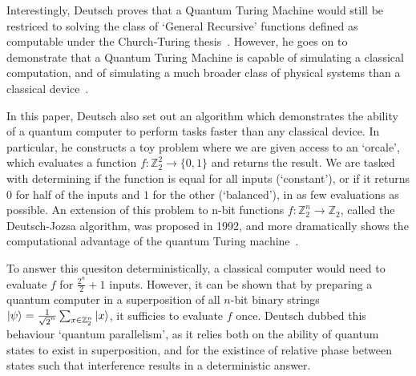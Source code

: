 \documentclass{standalone}
\begin{document}
\par
Interestingly, Deutsch proves that a Quantum Turing Machine would still be restriced to solving the class of `General Recursive' functions defined as computable under the Church-Turing thesis~\cite{Deutsch1985}. However, he goes on to demonstrate that a Quantum Turing Machine is capable of simulating a classical computation, and of simulating a much broader class of physical systems than a classical device~\cite{Deutsch1985}.
\par
In this paper, Deutsch also set out an algorithm which demonstrates the ability of a quantum computer to perform tasks faster than any classical device. In particular, he constructs a toy problem where we are given access to an `orcale', which evaluates a function $f:\mathbb{Z}_{2}^{2}\rightarrow\{0,1\}$ and returns the result. We are tasked with determining if the function is equal for all inputs (`constant'), or if it returns $0$ for half of the inputs and $1$ for the other (`balanced'), in as few evaluations as possible. An extension of this problem to n-bit functions $f:\mathbb{Z}_{2}^{n}\rightarrow\mathbb{Z}_{2}$, called the Deutsch-Jozsa algorithm, was proposed in 1992, and more dramatically shows the computational advantage of the quantum Turing machine~\cite{Deutsch92}.
\par
To answer this quesiton deterministically, a classical computer would need to evaluate $f$ for $\frac{2^{n}}{2}+1$ inputs. However, it can be shown that by preparing a quantum computer in a superposition of all $n$-bit binary strings $\ket{\psi}=\frac{1}{\sqrt{2}^{n}}\sum_{x\in\mathbb{Z}_{2}^{n}}\ket{x}$, it sufficies to evaluate $f$ once. Deutsch dubbed this behaviour `quantum parallelism', as it relies both on the ability of quantum states to exist in superposition, and for the existince of relative phase between states such that interference results in a deterministic answer.
\par
\end{document}
